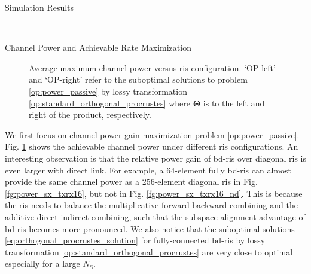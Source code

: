 \begin{section}{Simulation Results}
\begin{subsection}{-}

		\begin{subsubsection}{Channel Power and Achievable Rate Maximization}
			\begin{figure}[H]
				\centering
				\caption{
					Average maximum channel power versus \gls{ris} configuration.
					`OP-left' and `OP-right' refer to the suboptimal solutions to problem \eqref{op:power_passive} by lossy transformation \eqref{op:standard_orthogonal_procrustes} where $\mathbf{\Theta}$ is to the left and right of the product, respectively.
				}
				\label{fg:power_sx}
			\end{figure}

			We first focus on channel power gain maximization problem \eqref{op:power_passive}.
			Fig. \ref{fg:power_sx} shows the achievable channel power under different \gls{ris} configurations.
			An interesting observation is that the relative power gain of \gls{bd}-\gls{ris} over diagonal \gls{ris} is even larger with direct link.
			For example, a 64-element fully \gls{bd}-\gls{ris} can almost provide the same channel power as a 256-element diagonal \gls{ris} in Fig. \ref{fg:power_sx_txrx16}, but not in Fig. \ref{fg:power_sx_txrx16_nd}.
			This is because the \gls{ris} needs to balance the multiplicative forward-backward combining and the additive direct-indirect combining, such that the subspace alignment advantage of \gls{bd}-\gls{ris} becomes more pronounced.
			We also notice that the suboptimal solutions \eqref{eq:orthogonal_procrustes_solution} for fully-connected \gls{bd}-\gls{ris} by lossy transformation \eqref{op:standard_orthogonal_procrustes} are very close to optimal especially for a large $N_\mathrm{S}$.


\end{subsubsection}
\end{subsection}
\end{section}
